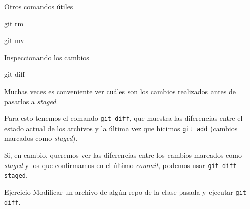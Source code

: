 \begin{frame}[t]{Otros comandos útiles}
    \begin{comando}
        git rm
    \end{comando}


    \vspace{2em}

    \begin{comando}
        git mv
    \end{comando}

\end{frame}

\begin{frame}[t]{Inspeccionando los cambios}
    \begin{comando}
        git diff
    \end{comando}

    \pause
    \begin{block}{}
        Muchas veces es conveniente ver cuáles son los cambios realizados antes de pasarlos a \textit{staged}.

        \vspace{.4em}

        Para esto tenemos el comando \texttt{git diff}, que muestra las diferencias entre
        el estado actual de los archivos y la última vez que hicimos \texttt{git add}
        (cambios marcados como \textit{staged}).

        \vspace{.4em}

        Si, en cambio, queremos ver las diferencias entre los cambios marcados como \textit{staged} y los
        que confirmamos en el último \textit{commit}, podemos usar \texttt{git diff --staged}.
    \end{block}

    \pause
    \begin{ejercicio}{Ejercicio}
        Modificar un archivo de algún repo de la clase pasada y ejecutar \texttt{git diff}.
    \end{ejercicio}
\end{frame}

